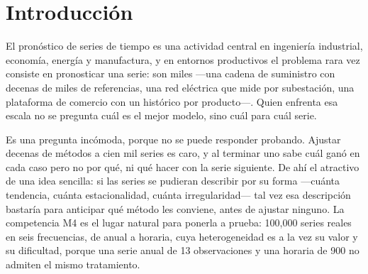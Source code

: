 \begin{abstract}
Ante una colección hay, sin embargo, dos decisiones y no una: qué método asignar a cada
serie y cuántos combinar. Medidas sobre los mismos datos con un \emph{bootstrap} que
remuestrea series, ambas ganancias son significativas y de magnitud comparable ---combinar
$+0.0267$ con intervalo $[+0.0143,\ +0.0393]$, estratificar $+0.0214$ con
$[+0.0110,\ +0.0328]$--- y su diferencia no lo es. La literatura por características
atiende casi solo a la primera, y lo que gobierna la segunda no es la estructura de las
series sino la dispersión de calidad del banco: con candidatos parejos combinar gana, y al
incorporar N-BEATS \cite{oreshkin2020} la conclusión se invierte en cada frecuencia donde
ese modelo domina, bajo un mismo mecanismo ---promediar cancela sesgos entre componentes
comparables y arrastra al mejor cuando uno domina---. El aporte del índice es máximo al
seleccionar ($+0.0215$) y se diluye al combinar hasta dejar de distinguirse de cero a
partir de tres modelos: la caracterización estructural resulta útil donde la política
elige, y no en los tamaños de conjunto que mejor rinden. Un resultado más modesto que el
que la premisa prometía y el que los datos sostienen.

\vspace{2mm}\noindent
\textbf{Palabras clave:} series de tiempo; competencia M4; características
estructurales; combinación de pronósticos; selección de modelos; análisis de
componentes principales; clustering; OWA; reproducibilidad.
\end{abstract}


\section{Introducción}

El pronóstico de series de tiempo es una actividad central en ingeniería industrial,
economía, energía y manufactura, y en entornos productivos el problema rara vez consiste
en pronosticar una serie: son miles ---una cadena de suministro con decenas de miles de
referencias, una red eléctrica que mide por subestación, una plataforma de comercio con un
histórico por producto---. Quien enfrenta esa escala no se pregunta cuál es el mejor
modelo, sino cuál para cuál serie.

Es una pregunta incómoda, porque no se puede responder probando. Ajustar decenas de
métodos a cien mil series es caro, y al terminar uno sabe cuál ganó en cada caso pero no
por qué, ni qué hacer con la serie siguiente. De ahí el atractivo de una idea sencilla: si
las series se pudieran describir por su forma ---cuánta tendencia, cuánta estacionalidad,
cuánta irregularidad--- tal vez esa descripción bastaría para anticipar qué método les
conviene, antes de ajustar ninguno. La competencia M4 \cite{makridakis2020} es el lugar
natural para ponerla a prueba: 100{,}000 series reales en seis frecuencias, de anual a
horaria, cuya heterogeneidad es a la vez su valor y su dificultad, porque una serie anual
de 13 observaciones y una horaria de 900 no admiten el mismo tratamiento.


